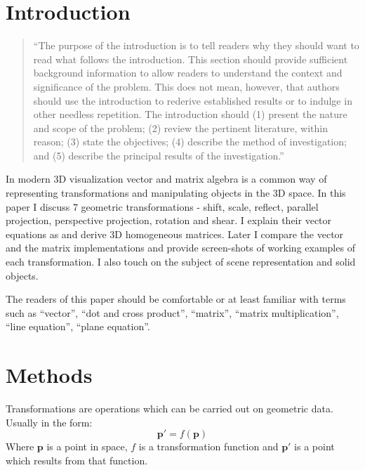 \documentclass[]{report}   %
\begin{document}
\chapter{Introduction}		%


\begin{quotation}
	``The purpose of the introduction is to tell readers why they should want to read what follows the introduction.
	This section should provide sufficient background information to allow readers to understand the context and
	significance of the problem. This does not mean, however, that authors should use the introduction to rederive
	established results or to indulge in other needless repetition. The introduction should (1) present the nature
	and scope of the problem; (2) review the pertinent literature, within reason; (3) state the objectives; (4)
	describe the method of investigation; and (5) describe the principal results of the investigation.''
\end{quotation}


In modern 3D visualization vector and matrix algebra is a common way of representing transformations and manipulating objects in the 3D space. In this paper I discuss 7 geometric transformations - shift, scale, reflect, parallel projection, perspective projection, rotation and shear. I explain their vector equations as and derive 3D homogeneous matrices. Later I compare the vector and the matrix implementations and provide screen-shots of working examples of each transformation. I also touch on the subject of scene representation and solid objects.

The readers of this paper should be comfortable or at least familiar with terms such as ``vector'', ``dot and cross product'', ``matrix'', ``matrix multiplication'', ``line equation'', ``plane equation''.




\chapter{Methods}           %


Transformations are operations which can be carried out on geometric data. Usually in the form:
\[
	\mathbf{p\prime} = f(\mathbf{p})
\]
Where \(\mathbf{p}\) is a point in space, \(f\) is a transformation function and \(\mathbf{p\prime}\) is a point which results from that function.
\end{document}
